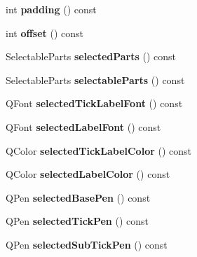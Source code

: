 \begin{DoxyCompactItemize}
\item 
int {\bfseries padding} () const \hypertarget{classQCPAxis_abb85015a9467ec176e70698307ec833a}{}\label{classQCPAxis_abb85015a9467ec176e70698307ec833a}

\item 
int {\bfseries offset} () const \hypertarget{classQCPAxis_aebc032ac6eea164a02859c017f52d5e7}{}\label{classQCPAxis_aebc032ac6eea164a02859c017f52d5e7}

\item 
Selectable\+Parts {\bfseries selected\+Parts} () const \hypertarget{classQCPAxis_a08323248a1cba4750ef07ceea159e0b3}{}\label{classQCPAxis_a08323248a1cba4750ef07ceea159e0b3}

\item 
Selectable\+Parts {\bfseries selectable\+Parts} () const \hypertarget{classQCPAxis_ad2bff3d2ed3d35c10d44c0c02441bd2c}{}\label{classQCPAxis_ad2bff3d2ed3d35c10d44c0c02441bd2c}

\item 
Q\+Font {\bfseries selected\+Tick\+Label\+Font} () const \hypertarget{classQCPAxis_ae245bb3dcd0ec71eee38437de6e719f7}{}\label{classQCPAxis_ae245bb3dcd0ec71eee38437de6e719f7}

\item 
Q\+Font {\bfseries selected\+Label\+Font} () const \hypertarget{classQCPAxis_a078bbc88b33595a5308350c2889c96d4}{}\label{classQCPAxis_a078bbc88b33595a5308350c2889c96d4}

\item 
Q\+Color {\bfseries selected\+Tick\+Label\+Color} () const \hypertarget{classQCPAxis_a5a3af4bd1a820bb7c6d4c85e1d8d452f}{}\label{classQCPAxis_a5a3af4bd1a820bb7c6d4c85e1d8d452f}

\item 
Q\+Color {\bfseries selected\+Label\+Color} () const \hypertarget{classQCPAxis_a8cf8de6ac7f1ca617e05412f669ed229}{}\label{classQCPAxis_a8cf8de6ac7f1ca617e05412f669ed229}

\item 
Q\+Pen {\bfseries selected\+Base\+Pen} () const \hypertarget{classQCPAxis_a5a3919ad7b60c2789b04c7e72387cfd6}{}\label{classQCPAxis_a5a3919ad7b60c2789b04c7e72387cfd6}

\item 
Q\+Pen {\bfseries selected\+Tick\+Pen} () const \hypertarget{classQCPAxis_a9f86ef82e1d1a908ab4c68cfa5fe4175}{}\label{classQCPAxis_a9f86ef82e1d1a908ab4c68cfa5fe4175}

\item 
Q\+Pen {\bfseries selected\+Sub\+Tick\+Pen} () const \hypertarget{classQCPAxis_a1b264fdfef48c22aba36e76de7856784}{}\label{classQCPAxis_a1b264fdfef48c22aba36e76de7856784}


\end{DoxyCompactItemize}
